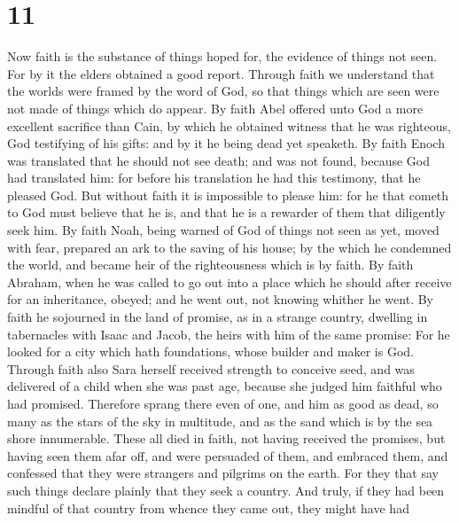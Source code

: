 \hypertarget{section-10}{%
\section{11}\label{section-10}}

 Now faith is the substance of things hoped for, the
evidence of things not seen.  For by it the elders
obtained a good report.  Through faith we understand that
the worlds were framed by the word of God, so that things which are seen
were not made of things which do appear.  By faith Abel
offered unto God a more excellent sacrifice than Cain, by which he
obtained witness that he was righteous, God testifying of his gifts: and
by it he being dead yet speaketh.  By faith Enoch was
translated that he should not see death; and was not found, because God
had translated him: for before his translation he had this testimony,
that he pleased God.  But without faith it is impossible
to please him: for he that cometh to God must believe that he is, and
that he is a rewarder of them that diligently seek him. 
By faith Noah, being warned of God of things not seen as yet, moved with
fear, prepared an ark to the saving of his house; by the which he
condemned the world, and became heir of the righteousness which is by
faith.  By faith Abraham, when he was called to go out
into a place which he should after receive for an inheritance, obeyed;
and he went out, not knowing whither he went.  By faith he
sojourned in the land of promise, as in a strange country, dwelling in
tabernacles with Isaac and Jacob, the heirs with him of the same
promise:  For he looked for a city which hath
foundations, whose builder and maker is God.  Through
faith also Sara herself received strength to conceive seed, and was
delivered of a child when she was past age, because she judged him
faithful who had promised.  Therefore sprang there even
of one, and him as good as dead, so many as the stars of the sky in
multitude, and as the sand which is by the sea shore innumerable.
 These all died in faith, not having received the
promises, but having seen them afar off, and were persuaded of them, and
embraced them, and confessed that they were strangers and pilgrims on
the earth.  For they that say such things declare plainly
that they seek a country.  And truly, if they had been
mindful of that country from whence they came out, they might have had
